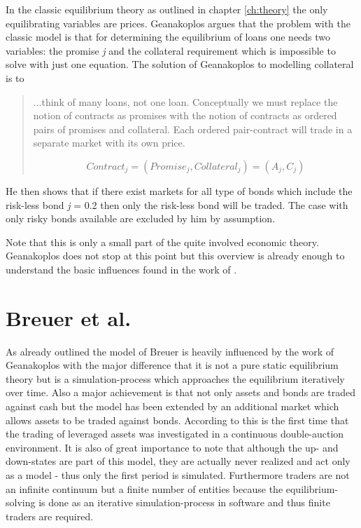 \documentclass[../Bachelorarbeit.tex]{subfiles}
\begin{document}
\medskip

In the classic equilibrium theory as outlined in chapter \ref{ch:theory} the only equilibrating variables are prices. Geanakoplos argues that the problem with the classic model is that for determining the equilibrium of loans one needs two variables: the promise \textit{j} and the collateral requirement which is impossible to solve with just one equation.
The solution of Geanakoplos to modelling collateral is to

\begin{quote}
...think of many loans, not one loan. Conceptually we must replace the notion of contracts as promises with the notion of contracts as ordered pairs of promises and collateral. Each ordered pair-contract will trade in a separate market with its own price.

\begin{equation}
Contract_j = (Promise_j, Collateral_j) = (A_j, C_j)
\end{equation}
\end{quote}

He then shows that if there exist markets for all type of bonds which include the risk-less bond \textit{j} = 0.2 then only the risk-less bond will be traded. The case with only risky bonds available are excluded by him by assumption.

\medskip

Note that this is only a small part of the quite involved economic theory. Geanakoplos does not stop at this point but this overview is already enough to understand the basic influences found in the work of \cite{Breuer2015}.

\section{Breuer et al.}
As already outlined the model of Breuer is heavily influenced by the work of Geanakoplos with the major difference that it is not a pure static equilibrium theory but is a simulation-process which approaches the equilibrium iteratively over time. Also a major achievement is that not only assets and bonds are traded against cash but the model has been extended by an additional market which allows assets to be traded against bonds. According to \cite{Breuer2015} this is the first time that the trading of leveraged assets was investigated in a continuous double-auction environment. It is also of great importance to note that although the up- and down-states are part of this model, they are actually never realized and act only as a model - thus only the first period is simulated. Furthermore traders are not an infinite continuum but a finite number of entities because the equilibrium-solving is done as an iterative simulation-process in software and thus finite traders are required.
\end{document}
